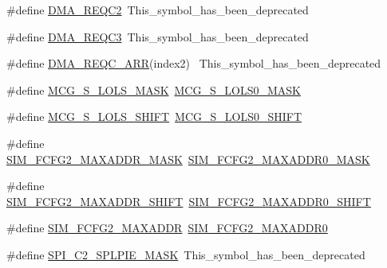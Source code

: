 \begin{DoxyCompactItemize}
\item 
\#define \hyperlink{group___backward___compatibility___symbols_ga49eb3e3e2e8e2323ffcc73e88075672f}{D\+M\+A\+\_\+\+R\+E\+Q\+C2}~This\+\_\+symbol\+\_\+has\+\_\+been\+\_\+deprecated
\item 
\#define \hyperlink{group___backward___compatibility___symbols_ga9fe628acf4e42637941f92c2886494b8}{D\+M\+A\+\_\+\+R\+E\+Q\+C3}~This\+\_\+symbol\+\_\+has\+\_\+been\+\_\+deprecated
\item 
\#define \hyperlink{group___backward___compatibility___symbols_ga0219a9cca9177ed55c20784941439140}{D\+M\+A\+\_\+\+R\+E\+Q\+C\+\_\+\+A\+RR}(index2)                                      ~This\+\_\+symbol\+\_\+has\+\_\+been\+\_\+deprecated
\item 
\#define \hyperlink{group___backward___compatibility___symbols_ga247a34b938aaa44d22f5cd4f56d95987}{M\+C\+G\+\_\+\+S\+\_\+\+L\+O\+L\+S\+\_\+\+M\+A\+SK}~\hyperlink{group___m_c_g___register___masks_gae5967720d747b4d6f9fa748c94570c6d}{M\+C\+G\+\_\+\+S\+\_\+\+L\+O\+L\+S0\+\_\+\+M\+A\+SK}
\item 
\#define \hyperlink{group___backward___compatibility___symbols_gae1d3f34b04899a885dcbd465e5154191}{M\+C\+G\+\_\+\+S\+\_\+\+L\+O\+L\+S\+\_\+\+S\+H\+I\+FT}~\hyperlink{group___m_c_g___register___masks_ga5cddd795823b73d50830e628cee24644}{M\+C\+G\+\_\+\+S\+\_\+\+L\+O\+L\+S0\+\_\+\+S\+H\+I\+FT}
\item 
\#define \hyperlink{group___backward___compatibility___symbols_ga1a81d18d9f76e9b66fe0959cf2a1f917}{S\+I\+M\+\_\+\+F\+C\+F\+G2\+\_\+\+M\+A\+X\+A\+D\+D\+R\+\_\+\+M\+A\+SK}~\hyperlink{group___s_i_m___register___masks_gad1096c0a75d0bf4dfc93f4b1957fe493}{S\+I\+M\+\_\+\+F\+C\+F\+G2\+\_\+\+M\+A\+X\+A\+D\+D\+R0\+\_\+\+M\+A\+SK}
\item 
\#define \hyperlink{group___backward___compatibility___symbols_gae8fbe7e05f4c39ee13322ab15d75d089}{S\+I\+M\+\_\+\+F\+C\+F\+G2\+\_\+\+M\+A\+X\+A\+D\+D\+R\+\_\+\+S\+H\+I\+FT}~\hyperlink{group___s_i_m___register___masks_ga3ccb8fde0ef2e170d0c84cdfa3651d34}{S\+I\+M\+\_\+\+F\+C\+F\+G2\+\_\+\+M\+A\+X\+A\+D\+D\+R0\+\_\+\+S\+H\+I\+FT}
\item 
\#define \hyperlink{group___backward___compatibility___symbols_gadcad6c136698a35d9732d3d849808a19}{S\+I\+M\+\_\+\+F\+C\+F\+G2\+\_\+\+M\+A\+X\+A\+D\+DR}~\hyperlink{group___s_i_m___register___masks_gaba3b670134023f4c71398fd21f4ba0fe}{S\+I\+M\+\_\+\+F\+C\+F\+G2\+\_\+\+M\+A\+X\+A\+D\+D\+R0}
\item 
\#define \hyperlink{group___backward___compatibility___symbols_gadcaa58bac25c102454d3f54da041122f}{S\+P\+I\+\_\+\+C2\+\_\+\+S\+P\+L\+P\+I\+E\+\_\+\+M\+A\+SK}~This\+\_\+symbol\+\_\+has\+\_\+been\+\_\+deprecated

\end{DoxyCompactItemize}
